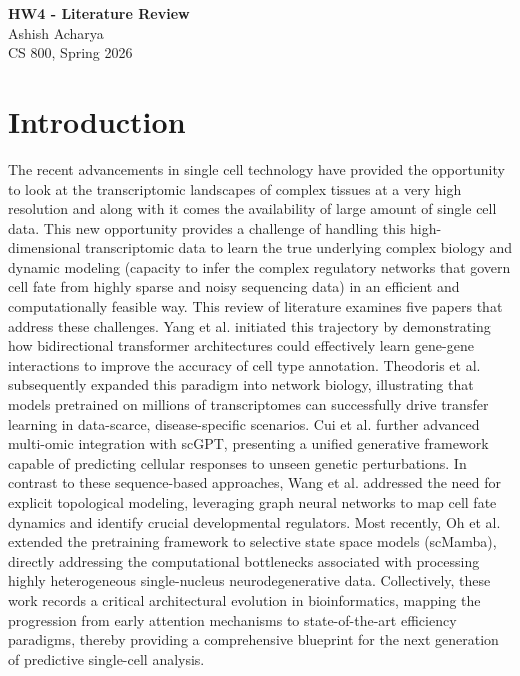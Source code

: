\documentclass[12pt]{article}
\begin{document}
\begin{centering}
{\large\textbf{HW4 - Literature Review}}\\
\vspace{3mm} %
Ashish Acharya\\
CS 800, Spring 2026\\
\end{centering}



\section{Introduction}
The recent advancements in single cell technology have provided the opportunity to look at the transcriptomic landscapes of complex tissues at a very high resolution and along with it comes the availability of large amount of single cell data. This new opportunity provides a challenge of handling this high-dimensional transcriptomic data to learn the true underlying complex biology and dynamic modeling (capacity to infer the complex regulatory networks that govern cell fate from highly sparse and noisy sequencing data) in an efficient and computationally feasible way. This review of literature examines five papers that address these challenges. Yang et al. \cite{yang2022scbert} initiated this trajectory by demonstrating how bidirectional transformer architectures could effectively learn gene-gene interactions to improve the accuracy of cell type annotation. Theodoris et al. \cite{theodoris2023transfer} subsequently expanded this paradigm into network biology, illustrating that models pretrained on millions of transcriptomes can successfully drive transfer learning in data-scarce, disease-specific scenarios. Cui et al.\cite{cui2024scgpt} further advanced multi-omic integration with scGPT, presenting a unified generative framework capable of predicting cellular responses to unseen genetic perturbations. In contrast to these sequence-based approaches, Wang et al. \cite{wang2023deciphering} addressed the need for explicit topological modeling, leveraging graph neural networks to map cell fate dynamics and identify crucial developmental regulators. Most recently, Oh et al. \cite{oh2025scmamba} extended the pretraining framework to selective state space models (scMamba), directly addressing the computational bottlenecks associated with processing highly heterogeneous single-nucleus neurodegenerative data. Collectively, these work records a critical architectural evolution in bioinformatics, mapping the progression from early attention mechanisms to state-of-the-art efficiency paradigms, thereby providing a comprehensive blueprint for the next generation of predictive single-cell analysis.
\end{document}
